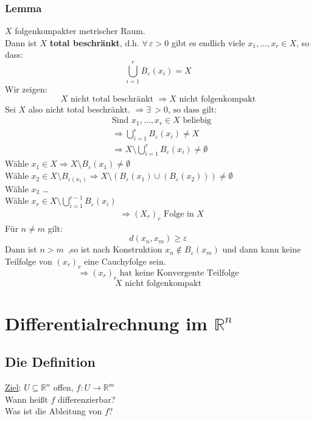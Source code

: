\subsubsection{Lemma} %
\label{ssub:lemma}
$X$ folgenkompakter metrischer Raum. \\
Dann ist $X$ {\bfseries total beschränkt}, d.h. $\forall\, \varepsilon>0$ gibt es endlich viele $x_1,\dots,x_r \in X$, so dass:
\[
	\bigcup\limits_{i=1}^r B_{\varepsilon}(x_i)=X
\]
 Wir zeigen: 
\[
	X \text{ nicht total beschränkt } \Rightarrow X \text{ nicht folgenkompakt}
\]
Sei $X$ also nicht total beschränkt. $\Rightarrow \exists\,>0 \text{, so dass gilt:}$
\begin{align*}
		&\text{Sind } x_1,\dots,x_r \in X \text{ beliebig} \\
		&\Rightarrow \bigcup\limits_{i=1}^rB_{\varepsilon}(x_i) \neq X \\
		&\Rightarrow X \setminus \bigcup\limits_{i=1}^rB_{\varepsilon}(x_i) \neq \emptyset
\end{align*}
Wähle $x_1 \in X \Rightarrow X \setminus B_{\varepsilon}(x_1) \neq \emptyset$ \\
Wähle $x_2 \in X \setminus B_{\varepsilon(x_1)} \Rightarrow X \setminus (B_{\varepsilon}(x_1)\cup(B_{\varepsilon}(x_2))) \neq \emptyset$ \\
Wähle $x_3$ \dots \\
Wähle $x_r \in X \setminus \bigcup\limits_{i=1}^{r-1}B_{\varepsilon}(x_i)$
\begin{align*}
	&\Rightarrow (X_r)_r \text{ Folge in }X 
\end{align*}	
	Für $n \neq m$ gilt: 
	\[
		d(x_n,x_m) \geq \varepsilon
	\]
	Dann ist $n>m$ \,,so ist nach Konstruktion  $x_n \notin B_{\varepsilon}(x_m)$ und 
	dann kann keine Teilfolge von $(x_r)_r$ eine Cauchyfolge sein.
 \[
 	\Rightarrow  (x_r)_r \text{ hat keine Konvergente Teilfolge} \]
	\[
		X \text{ nicht folgenkompakt}
	\]
\bewende


\newpage
\section{Differentialrechnung im $\mathbb{R}^n$} %
\label{sec:differentialrechnung_im_mathbb_r_n}

\subsection{Die Definition} %
\label{sub:die_definition}
\underline{Ziel}: $U \subseteq  \mathbb{R}^n$ offen, $f: U \to \mathbb{R}^m$ \\
Wann heißt $f$ differenzierbar? \\
Was ist die Ableitung von $f$? 
